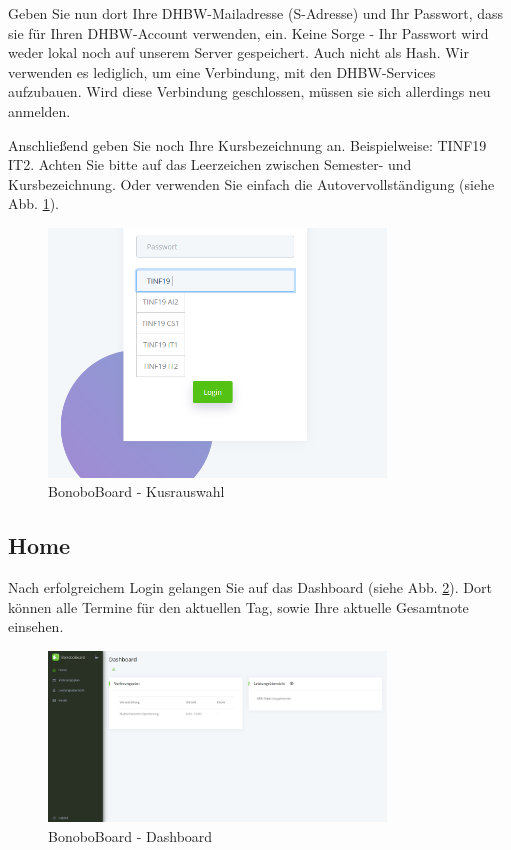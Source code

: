 \documentclass[a4paper,11pt]{scrartcl}
\begin{document}
\noindent Geben Sie nun dort Ihre DHBW-Mailadresse (\frqq{}S-Adresse\flqq{}) und Ihr Passwort, dass sie für Ihren DHBW-Account verwenden, ein. Keine Sorge - Ihr Passwort wird weder lokal noch auf unserem Server gespeichert. Auch nicht als Hash. Wir verwenden es lediglich, um eine Verbindung, mit den DHBW-Services aufzubauen. Wird diese Verbindung geschlossen, müssen sie sich allerdings neu anmelden.

\bigskip
\noindent Anschließend geben Sie noch Ihre Kursbezeichnung an. Beispielweise: \frqq{}TINF19 IT2\flqq{}. Achten Sie bitte auf das Leerzeichen zwischen Semester- und Kursbezeichnung. Oder verwenden Sie einfach die Autovervollständigung (siehe Abb. \ref{img:autocomplete}).
\begin{figure}[H]
	\begin{center}
		\includegraphics[width=0.8\textwidth]{autocomplete}
		\caption{BonoboBoard - Kusrauswahl}
		\label{img:autocomplete}
	\end{center}
\end{figure}
\noindent

\subsection{Home}
Nach erfolgreichem Login gelangen Sie auf das Dashboard (siehe Abb. \ref{img:dashboard}). Dort können alle Termine für den aktuellen Tag, sowie Ihre aktuelle Gesamtnote einsehen.

\begin{figure}[H]
	\begin{center}
		\includegraphics[width=0.8\textwidth]{Dashboard}
		\caption{BonoboBoard - Dashboard}
		\label{img:dashboard}
	\end{center}
\end{figure}
\noindent
\end{document}
